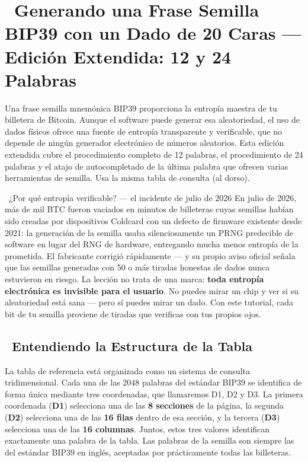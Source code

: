 \documentclass[10pt]{article}
\begin{document}
\section*{\faBitcoin~Generando una Frase Semilla BIP39 con un Dado de 20 Caras --- Edición Extendida: 12 y 24 Palabras}

\footnotesize

Una frase semilla mnemónica BIP39 proporciona la entropía maestra de tu billetera de Bitcoin. Aunque el software puede generar esa aleatoriedad, el uso de dados físicos ofrece una fuente de entropía transparente y verificable, que no depende de ningún generador electrónico de números aleatorios. Esta edición extendida cubre el procedimiento completo de 12 palabras, el procedimiento de 24 palabras y el atajo de autocompletado de la última palabra que ofrecen varias herramientas de semilla. Usa la misma tabla de consulta (al dorso).

\begin{contextbox}{\faNewspaper~¿Por qué entropía verificable? --- el incidente de julio de 2026}
En julio de 2026, más de mil BTC fueron vaciados en minutos de billeteras cuyas semillas habían sido creadas por dispositivos Coldcard con un defecto de firmware existente desde 2021: la generación de la semilla usaba silenciosamente un PRNG predecible de software en lugar del RNG de hardware, entregando mucha menos entropía de la prometida. El fabricante corrigió rápidamente --- y su propio aviso oficial señala que las semillas generadas con 50 o más tiradas honestas de dados nunca estuvieron en riesgo. La lección no trata de una marca: \textbf{toda entropía electrónica es invisible para el usuario}. No puedes mirar un chip y ver si su aleatoriedad está sana --- pero sí puedes mirar un dado. Con este tutorial, cada bit de tu semilla proviene de tiradas que verificas con tus propios ojos.
\end{contextbox}

\subsection*{\faTable~Entendiendo la Estructura de la Tabla}

La tabla de referencia está organizada como un sistema de consulta tridimensional. Cada una de las 2048 palabras del estándar BIP39 se identifica de forma única mediante tres coordenadas, que llamaremos D1, D2 y D3. La primera coordenada (\textbf{D1}) selecciona una de las \textbf{8 secciones} de la página, la segunda (\textbf{D2}) selecciona una de las \textbf{16 filas} dentro de esa sección, y la tercera (\textbf{D3}) selecciona una de las \textbf{16 columnas}. Juntos, estos tres valores identifican exactamente una palabra de la tabla. Las palabras de la semilla son siempre las del estándar BIP39 en inglés, aceptadas por prácticamente todas las billeteras.
\end{document}
